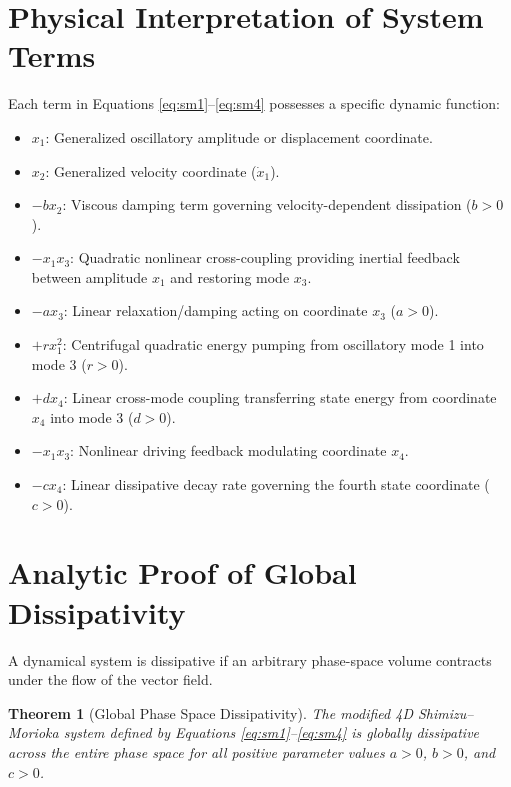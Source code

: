 \documentclass[12pt,a4paper,oneside]{report}
\newtheorem{theorem}{Theorem}[chapter]
\begin{document}
\section{Physical Interpretation of System Terms}
Each term in Equations \eqref{eq:sm1}--\eqref{eq:sm4} possesses a specific dynamic function:
\begin{itemize}
    \item $x_1$: Generalized oscillatory amplitude or displacement coordinate.
    \item $x_2$: Generalized velocity coordinate ($\dot{x}_1$).
    \item $-b x_2$: Viscous damping term governing velocity-dependent dissipation ($b > 0$).
    \item $-x_1 x_3$: Quadratic nonlinear cross-coupling providing inertial feedback between amplitude $x_1$ and restoring mode $x_3$.
    \item $-a x_3$: Linear relaxation/damping acting on coordinate $x_3$ ($a > 0$).
    \item $+r x_1^2$: Centrifugal quadratic energy pumping from oscillatory mode 1 into mode 3 ($r > 0$).
    \item $+d x_4$: Linear cross-mode coupling transferring state energy from coordinate $x_4$ into mode 3 ($d > 0$).
    \item $-x_1 x_3$: Nonlinear driving feedback modulating coordinate $x_4$.
    \item $-c x_4$: Linear dissipative decay rate governing the fourth state coordinate ($c > 0$).
\end{itemize}

\section{Analytic Proof of Global Dissipativity}
A dynamical system is dissipative if an arbitrary phase-space volume contracts under the flow of the vector field.

\begin{theorem}[Global Phase Space Dissipativity]
The modified 4D Shimizu--Morioka system defined by Equations \eqref{eq:sm1}--\eqref{eq:sm4} is globally dissipative across the entire phase space for all positive parameter values $a > 0$, $b > 0$, and $c > 0$.
\end{theorem}
\end{document}

